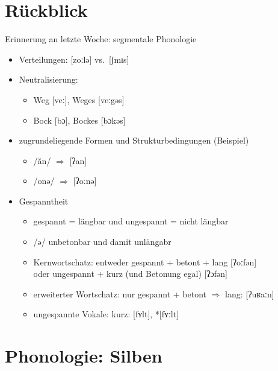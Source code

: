 
\section{Rückblick}

\begin{frame}
  {Erinnerung an letzte Woche: segmentale Phonologie}
  \pause
  \begin{itemize}[<+->]
    \item Verteilungen: [\alert{z}oːlə] vs.\ [ʃmɪ\alert{s}]
    \item Neutralisierung:
      \begin{itemize}[<+->]
        \item  Weg [veː], Weges [veː\alert{g}əs]
        \item Bock [bɔ], Bockes [bɔ\alert{k}əs]
      \end{itemize}
    \item zugrundeliegende Formen und Strukturbedingungen (Beispiel)
      \begin{itemize}[<+->]
        \item /ăn/ $\Rightarrow$ [ʔan]
        \item /onə/ $\Rightarrow$ [ʔoːnə] 
      \end{itemize}
    \item Gespanntheit
      \begin{itemize}[<+->]
        \item \alert{gespannt = längbar} und \alert{ungespannt = nicht längbar}
        \item \alert{/ə/ unbetonbar und damit unlängabr}
        \item Kernwortschatz: entweder \alert{gespannt + betont + lang} [ʔoːfən]\\
          oder \alert{ungespannt + kurz} (und Betonung egal) [ʔɔfən]
        \item erweiterter Wortschatz: \alert{nur} \alert{gespannt + betont $\Rightarrow$ lang}: [ʔuʁaːn]
        \item ungespannte Vokale:  kurz: [fʏlt], *[fʏːlt]
      \end{itemize}
  \end{itemize}
\end{frame}



\section{Phonologie: Silben}

